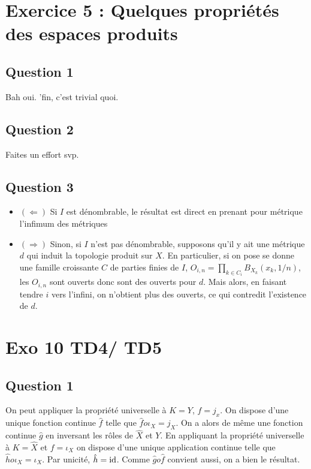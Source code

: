 \documentclass{cours}
\begin{document}
\section{Exercice 5 : Quelques propriétés des espaces produits}
    \subsection{Question 1}
            Bah oui. 'fin, c'est trivial quoi. 

    \subsection{Question 2}
            Faites un effort svp.

    \subsection{Question 3}
            \begin{itemize}
                \item $(\Leftarrow)$ Si $I$ est dénombrable, le résultat est direct en prenant pour métrique l'infimum des métriques
                \item $(\Rightarrow)$ Sinon, si $I$ n'est pas dénombrable, supposons qu'il y ait une métrique $d$ qui induit la topologie produit sur $X$. En particulier, si on pose se donne une famille croissante $C$ de parties finies de $I$, $O_{i, n} = \prod_{k \in C_{i}} B_{X_{k}}(x_{k}, 1/n)$, les $O_{i, n}$ sont ouverts donc sont des ouverts pour $d$. Mais alors, en faisant tendre $i$ vers l'infini, on n'obtient plus des ouverts, ce qui contredit l'existence de $d$. 
            \end{itemize}


\section{Exo 10 TD4/ TD5}

\subsection{Question 1}
On peut appliquer la propriété universelle à $K = Y$, $f = j_{x}$. On dispose d'une unique fonction continue $\hat{f}$ telle que $\hat{f} o \iota_{X} = j_{X}$. On a alors de même une fonction continue $\hat{g}$ en inversant les rôles de $\hat{X}$ et $Y$.
En appliquant la propriété universelle à $K = \hat{X}$ et $f = \iota_{X}$ on dispose d'une unique application continue telle que $\hat{h} o \iota_{X} = \iota_{X}$. Par unicité, $\hat{h} = \textmd{id}$. Comme $\hat{g} o \hat{f}$ convient aussi, on a bien le résultat.
\end{document}
